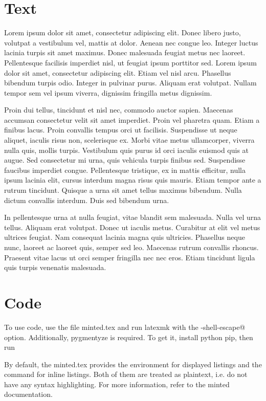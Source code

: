 \section{Text}

Lorem ipsum dolor sit amet, consectetur adipiscing elit.
Donec libero justo, volutpat a vestibulum vel, mattis at dolor.
Aenean nec congue leo.
Integer luctus lacinia turpis sit amet maximus.
Donec malesuada feugiat metus nec laoreet.
Pellentesque facilisis imperdiet nisl, ut feugiat ipsum porttitor sed.
Lorem ipsum dolor sit amet, consectetur adipiscing elit.
Etiam vel nisl arcu.
Phasellus bibendum turpis odio.
Integer in pulvinar purus.
Aliquam erat volutpat.
Nullam tempor sem vel ipsum viverra, dignissim fringilla metus dignissim.

Proin dui tellus, tincidunt et nisl nec, commodo auctor sapien.
Maecenas accumsan consectetur velit sit amet imperdiet.
Proin vel pharetra quam.
Etiam a finibus lacus.
Proin convallis tempus orci ut facilisis.
Suspendisse ut neque aliquet, iaculis risus non, scelerisque ex.
Morbi vitae metus ullamcorper, viverra nulla quis, mollis turpis.
Vestibulum quis purus id orci iaculis euismod quis at augue.
Sed consectetur mi urna, quis vehicula turpis finibus sed.
Suspendisse faucibus imperdiet congue.
Pellentesque tristique, ex in mattis efficitur, nulla ipsum lacinia elit, cursus interdum magna risus quis mauris.
Etiam tempor ante a rutrum tincidunt.
Quisque a urna sit amet tellus maximus bibendum.
Nulla dictum convallis interdum.
Duis sed bibendum urna.

In pellentesque urna at nulla feugiat, vitae blandit sem malesuada.
Nulla vel urna tellus.
Aliquam erat volutpat.
Donec ut iaculis metus.
Curabitur at elit vel metus ultrices feugiat.
Nam consequat lacinia magna quis ultricies.
Phasellus neque nunc, laoreet ac laoreet quis, semper sed leo.
Maecenas rutrum convallis rhoncus.
Praesent vitae lacus ut orci semper fringilla nec nec eros.
Etiam tincidunt ligula quis turpis venenatis malesuada.


\section{Code}

To use code, use the file minted.tex and
run latexmk with the \icode@-shell-escape@ option.
Additionally, pygmentyze is required.
To get it, install python pip, then run

By default, the minted.tex provides the environment
\icode@code@ for displayed listings and the command \icode@\icode@
for inline listings.
Both of them are treated as plaintext, i.e. do not have any syntax highlighting.
For more information, refer to the minted documentation.